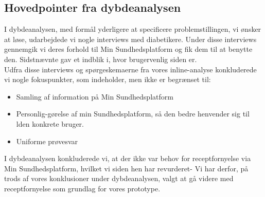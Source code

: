 \subsection{Hovedpointer fra dybdeanalysen}
I dybdeanalysen, med formål yderligere at specificere problemstillingen, vi ønsker at løse, udarbejdede vi nogle interviews med diabetikere. Under disse interviews gennemgik vi deres forhold til Min Sundhedsplatform og fik dem til at benytte den. Sidstnævnte gav et indblik i, hvor brugervenlig siden er.\\
Udfra disse interviews og spørgeskemaerne fra vores inline-analyse konkluderede vi nogle fokuspunkter, som indeholder, men ikke er begrænset til:
\begin{itemize}
  \item Samling af information på Min Sundhedsplatform
  \item Personlig-gørelse af min Sundhedsplatform, så den bedre henvender sig til lden konkrete bruger.
  \item Uniforme prøvesvar
\end{itemize}
I dybdeanalysen konkluderede vi, at der ikke var behov for receptfornyelse via Min Sundhedsplatform, hvilket vi siden hen har revurderet- Vi har derfor, på trods af vores konklusioner under dybdeanalysen, valgt at gå videre med receptfornyelse som grundlag for vores prototype.


